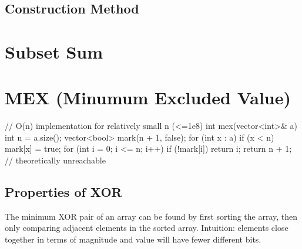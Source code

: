 \documentclass[12pt]{extarticle}
\begin{document}
\subsection*{Construction Method}

\newpage
\section*{Subset Sum}
\section*{MEX (Minumum Excluded Value)}
\begin{cpp}
// O(n) implementation for relatively small n (<=1e8)
int mex(vector<int>& a) {
	int n = a.size();
	vector<bool> mark(n + 1, false);
	for (int x : a) {
		if (x < n) mark[x] = true;
	}
	for (int i = 0; i <= n; i++) {
		if (!mark[i]) return i;
	}
	return n + 1; // theoretically unreachable
}
\end{cpp}
\subsection*{Properties of XOR}
The minimum XOR pair of an array can be found by first sorting the array, then only comparing adjacent elements in the sorted array. Intuition: elements close together in terms of magnitude and value will have fewer different bits. 
\end{document}
